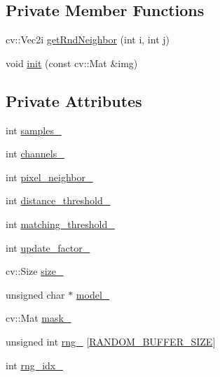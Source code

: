 \subsection*{Private Member Functions}
\begin{DoxyCompactItemize}
\item 
cv\+::\+Vec2i \mbox{\hyperlink{classvibe_1_1_v_i_b_e_a5ca071697edce3a8459f93cba2386516}{get\+Rnd\+Neighbor}} (int i, int j)
\item 
void \mbox{\hyperlink{classvibe_1_1_v_i_b_e_a4db865cd319617161c13e4303471c33e}{init}} (const cv\+::\+Mat \&img)
\end{DoxyCompactItemize}
\subsection*{Private Attributes}
\begin{DoxyCompactItemize}
\item 
int \mbox{\hyperlink{classvibe_1_1_v_i_b_e_ab27dfab66880b3b9fe8ceeafde283f4c}{samples\+\_\+}}
\item 
int \mbox{\hyperlink{classvibe_1_1_v_i_b_e_a141be141bc39ddd6b9dd04df62b5e3b9}{channels\+\_\+}}
\item 
int \mbox{\hyperlink{classvibe_1_1_v_i_b_e_ace9a8955d2ca2acdcb8efe79a448ce7c}{pixel\+\_\+neighbor\+\_\+}}
\item 
int \mbox{\hyperlink{classvibe_1_1_v_i_b_e_a2e55ef7f6496c14481359d9131135b2b}{distance\+\_\+threshold\+\_\+}}
\item 
int \mbox{\hyperlink{classvibe_1_1_v_i_b_e_a70dd63f8644e1f36bfd32c58f02593ee}{matching\+\_\+threshold\+\_\+}}
\item 
int \mbox{\hyperlink{classvibe_1_1_v_i_b_e_a3abaee256b69fec3b0b49805a0e92e0c}{update\+\_\+factor\+\_\+}}
\item 
cv\+::\+Size \mbox{\hyperlink{classvibe_1_1_v_i_b_e_a4748d53eff7e5a96ad4f98206dc7bb2c}{size\+\_\+}}
\item 
unsigned char $\ast$ \mbox{\hyperlink{classvibe_1_1_v_i_b_e_af42cd53bbc91e95f14aa6c474bde5601}{model\+\_\+}}
\item 
cv\+::\+Mat \mbox{\hyperlink{classvibe_1_1_v_i_b_e_a7840cacb0f0c76e6280a8a4fad32e136}{mask\+\_\+}}
\item 
unsigned int \mbox{\hyperlink{classvibe_1_1_v_i_b_e_abc43782cfa12e3f055fa1212833f8595}{rng\+\_\+}} \mbox{[}\mbox{\hyperlink{vibe_8hpp_a776fe25c29d34b95d69a1418f75ae80f}{R\+A\+N\+D\+O\+M\+\_\+\+B\+U\+F\+F\+E\+R\+\_\+\+S\+I\+ZE}}\mbox{]}
\item 
int \mbox{\hyperlink{classvibe_1_1_v_i_b_e_a76075aca9f68dffb84163e510b2dd122}{rng\+\_\+idx\+\_\+}}
\end{DoxyCompactItemize}


